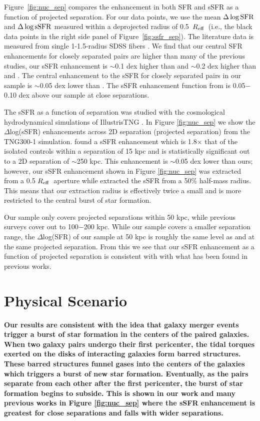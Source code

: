 \documentclass[iop,revtex4,twocolumn,apj,numberedappendix,appendixfloats]{emulateapj}
\newcommand{\reff}{$R_{\rm eff}$}
\begin{document}
Figure~\ref{fig:nuc_sep} compares the enhancement in both SFR and sSFR as a function of projected separation. For our data points, we use the mean $\Delta\log{\rm SFR}$ and $\Delta\log{\rm sSFR}$ measured within a deprojected radius of 0.5~\reff\ (i.e., the black data points in the right side panel of Figure~\ref{fig:ssfr_sep}). The literature data is measured from single 1-1.5\arcsec-radius SDSS fibers \citep{Ellison:2008,Scudder:2012,Patton:2013,Bustamante:2020}. We find that our central SFR enhancements for closely separated pairs are higher than many of the previous studies, our sSFR enhancement is $\sim$0.1 dex higher than \citet{Scudder:2012} and $\sim$0.2 dex higher than \citet{Ellison:2008} and \citet{Bustamante:2020}. The central enhancement to the sSFR for closely separated pairs in our sample is $\sim$0.05 dex lower than \citet{Patton:2013}. The sSFR enhancement function from \citet{Li:2008} is 0.05$-$0.10 dex above our sample at close separations.   

The sSFR as a function of separation was studied with the cosmological hydrodynamical simulations of IllustrisTNG \citep{Patton:2020}. In Figure \ref{fig:nuc_sep} we show the $\Delta$log(sSFR) enhancements across 2D separation (projected separation) from the TNG300-1 simulation. \citet{Patton:2020} found a sSFR enhancement which is 1.8$\times$ that of the isolated controls within a separation of 15 kpc and is statistically significant out to a 2D separation of $\sim$250 kpc. This enhancement is $\sim$0.05 dex lower than ours; however, our sSFR enhancement shown in Figure \ref{fig:nuc_sep} was extracted from a 0.5 \reff\ aperture while \citet{Patton:2020} extracted the sSFR from a 50\% half-mass radius. This means that our extraction radius is effectively twice a small and is more restricted to the central burst of star formation. 

Our sample only covers projected separations within 50 kpc, while previous surveys cover out to 100$-$200 kpc. While our sample covers a smaller separation range, the $\Delta$log(SFR) of our sample at 50 kpc is roughly the same level as \citet{Ellison:2008} and \citet{Bustamante:2020} at the same projected separation. From this we see that our sSFR enhancement as a function of projected separation is consistent with with what has been found in previous works. 

\section{Physical Scenario}
\textbf{
Our results are consistent with the idea that galaxy merger events trigger a burst of star formation in the centers of the paired galaxies. When two galaxy pairs undergo their first pericenter, the tidal torques exerted on the disks of interacting galaxies form barred structures. These barred structures funnel gases into the centers of the galaxies which triggers a burst of new star formation. Eventually, as the pairs separate from each other after the first pericenter, the burst of star formation begins to subside. This is shown in our work and many previous works in Figure \ref{fig:nuc_sep} where the sSFR enhancement is greatest for close separations and falls with wider separations. 
}
\end{document}

